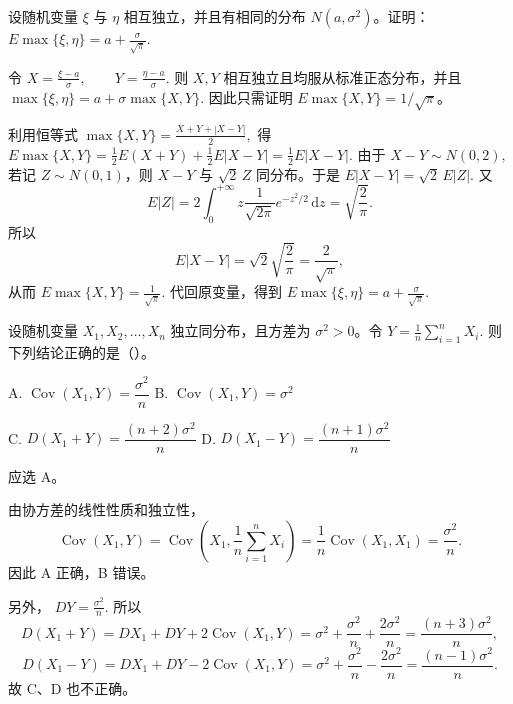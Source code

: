 \documentclass[lang=cn,11pt]{elegantbook}
\begin{document}
\begin{exercise}\label{exer:src-2010-0630-a-06}
设随机变量 \(\xi\) 与 \(\eta\) 相互独立，并且有相同的分布 \(N(a,\sigma^2)\)。证明：
\(
E\max\{\xi,\eta\}=a+\frac{\sigma}{\sqrt{\pi}}.
\)
\end{exercise}
\begin{solution}
令
\(
X=\frac{\xi-a}{\sigma},\qquad Y=\frac{\eta-a}{\sigma}.
\)
则 \(X,Y\) 相互独立且均服从标准正态分布，并且
\(
\max\{\xi,\eta\}=a+\sigma\max\{X,Y\}.
\)
因此只需证明 \(E\max\{X,Y\}=1/\sqrt{\pi}\)。

利用恒等式
\(
\max\{X,Y\}=\frac{X+Y+|X-Y|}{2},
\)
得
\(
E\max\{X,Y\}
=\frac12E(X+Y)+\frac12E|X-Y|
=\frac12E|X-Y|.
\)
由于
\(
X-Y\sim N(0,2),
\)
若记 \(Z\sim N(0,1)\)，则 \(X-Y\) 与 \(\sqrt2\,Z\) 同分布。于是
\(
E|X-Y|=\sqrt2\,E|Z|.
\)
又
\[
E|Z|=2\int_0^{+\infty}z\frac1{\sqrt{2\pi}}e^{-z^2/2}\,\mathrm dz
=\sqrt{\frac2\pi}.
\]
所以
\[
E|X-Y|=\sqrt2\sqrt{\frac2\pi}=\frac2{\sqrt{\pi}},
\]
从而
\(
E\max\{X,Y\}=\frac1{\sqrt{\pi}}.
\)
代回原变量，得到
\(
E\max\{\xi,\eta\}=a+\frac{\sigma}{\sqrt{\pi}}.
\)
\end{solution}



\begin{exercise}\label{exer:src-2008-probstat-2a-i-03}\label{exer:src-paper3-ii-03}\label{prob:p3-ii-03}
设随机变量 \(X_1,X_2,\dots,X_n\) 独立同分布，且方差为 \(\sigma^2>0\)。令
\(
Y=\frac1n\sum_{i=1}^n X_i.
\)
则下列结论正确的是（\quad）。\par
A. \(\operatorname{Cov}(X_1,Y)=\dfrac{\sigma^2}{n}\)\quad
B. \(\operatorname{Cov}(X_1,Y)=\sigma^2\)\par
C. \(D(X_1+Y)=\dfrac{(n+2)\sigma^2}{n}\)\quad
D. \(D(X_1-Y)=\dfrac{(n+1)\sigma^2}{n}\)
\end{exercise}
\begin{solution}
应选 A。

由协方差的线性性质和独立性，
\[
\operatorname{Cov}(X_1,Y)
=\operatorname{Cov}\!\left(X_1,\frac1n\sum_{i=1}^nX_i\right)
=\frac1n\operatorname{Cov}(X_1,X_1)
=\frac{\sigma^2}{n}.
\]
因此 A 正确，B 错误。

另外，
\(
DY=\frac{\sigma^2}{n}.
\)
所以
\[
D(X_1+Y)=DX_1+DY+2\operatorname{Cov}(X_1,Y)
=\sigma^2+\frac{\sigma^2}{n}+\frac{2\sigma^2}{n}
=\frac{(n+3)\sigma^2}{n},
\]
\[
D(X_1-Y)=DX_1+DY-2\operatorname{Cov}(X_1,Y)
=\sigma^2+\frac{\sigma^2}{n}-\frac{2\sigma^2}{n}
=\frac{(n-1)\sigma^2}{n}.
\]
故 C、D 也不正确。
\end{solution}
\end{document}
